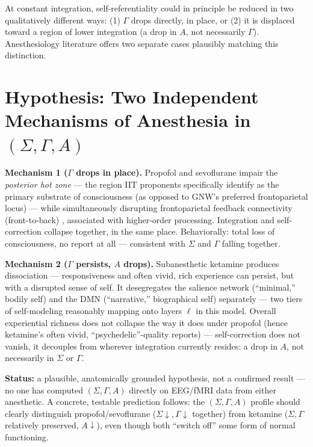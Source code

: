 \documentclass[11pt]{article}
\begin{document}
At constant integration, self-referentiality could in principle be reduced in two qualitatively different ways: (1) $\Gamma$ drops directly, in place, or (2) it is displaced toward a region of lower integration (a drop in $A$, not necessarily $\Gamma$). Anesthesiology literature offers two separate cases plausibly matching this distinction.

\section{Hypothesis: Two Independent Mechanisms of Anesthesia in $(\Sigma,\Gamma,A)$}

\textbf{Mechanism 1 ($\Gamma$ drops in place).} Propofol and sevoflurane impair the \emph{posterior hot zone} \cite{hotzone2021} --- the region IIT proponents specifically identify as the primary substrate of consciousness (as opposed to GNW's preferred frontoparietal locus) --- while simultaneously disrupting frontoparietal feedback connectivity (front-to-back) \cite{sarasso2013}, associated with higher-order processing. Integration and self-correction collapse together, in the same place. Behaviorally: total loss of consciousness, no report at all --- consistent with $\Sigma$ and $\Gamma$ falling together.

\textbf{Mechanism 2 ($\Gamma$ persists, $A$ drops).} Subanesthetic ketamine produces dissociation --- responsiveness and often vivid, rich experience can persist, but with a disrupted sense of self. It desegregates the salience network (``minimal,'' bodily self) and the DMN (``narrative,'' biographical self) separately \cite{vollenweider2022} --- two tiers of self-modeling reasonably mapping onto layers $\ell$ in this model. Overall experiential richness does not collapse the way it does under propofol (hence ketamine's often vivid, ``psychedelic''-quality reports) --- self-correction does not vanish, it decouples from wherever integration currently resides: a drop in $A$, not necessarily in $\Sigma$ or $\Gamma$.

\textbf{Status:} a plausible, anatomically grounded hypothesis, not a confirmed result --- no one has computed $(\Sigma,\Gamma,A)$ directly on EEG/fMRI data from either anesthetic. A concrete, testable prediction follows: the $(\Sigma,\Gamma,A)$ profile should clearly distinguish propofol/sevoflurane ($\Sigma\downarrow,\Gamma\downarrow$ together) from ketamine ($\Sigma,\Gamma$ relatively preserved, $A\downarrow$), even though both ``switch off'' some form of normal functioning.
\end{document}
